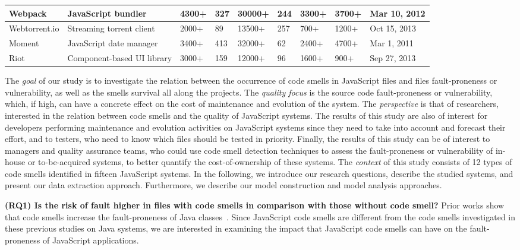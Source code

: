 \begin{table*}[!htbp]
\begin{tabular}{l|l|l|l|l|l|l|l|l}
Webpack	 & JavaScript bundler		& 4300+		 & 327			   & 30000+			 & 244 		   & 3300+			  & 3700+	 & Mar 10, 2012 		   \\ \hline
Webtorrent.io & Streaming torrent client & 2000+	 & 89			   & 13500+			 & 257		   & 700+			  & 1200+	 & Oct 15, 2013		   \\ \hline
Moment	 & JavaScript date manager  & 3400+		 & 413			   & 32000+			 & 62		   & 2400+			  & 4700+ 	 & Mar 1, 2011			   \\ \hline
Riot	 & Component-based UI library & 3000+ 	 & 159			   & 12000+			 & 96 		   & 1600+			  & 900+	 & Sep 27, 2013		   \\ \hline
\end{tabular}
\vspace{-15pt}
\end{table*}

The \emph{goal} of our study is to investigate the relation between the occurrence of code smells in JavaScript files and files fault-proneness or vulnerability, as well as the smells survival all along the projects. The \emph{quality focus} is the source code fault-proneness {\color{blue}or vulnerability}, which, if high, can have a concrete effect on the cost of maintenance and evolution of the system. The \emph{perspective} is that of researchers, interested in the relation between code smells and the quality of JavaScript systems. The results of this study are also of interest for developers performing maintenance and evolution activities on JavaScript systems since they need to take
into account and forecast their effort, and to testers, who need to know which files should be tested in priority. Finally, the results of this study can be of interest to managers and quality assurance teams, who could use code smell detection techniques to assess the fault-proneness {\color{blue}or vulnerability} of in-house or to-be-acquired systems, to better quantify
the cost-of-ownership of these systems. The \emph{context} of this study consists of 12 types of code smells identified in {\color{blue}fifteen} JavaScript systems. In the following, we introduce our research questions, describe the studied systems, and present our data extraction approach. Furthermore, we describe our model construction and model analysis approaches.

\textbf{(RQ1) Is the risk of fault higher in files with code smells in comparison with those without code smell?}
Prior works show that code smells increase the fault-proneness of Java classes~\cite{Khomh2012,jaafar2013mining}. Since JavaScript code smells are different from the code smells investigated in these previous studies on Java systems, we are interested in examining the impact that JavaScript code smells can have on the fault-proneness of JavaScript applications.

